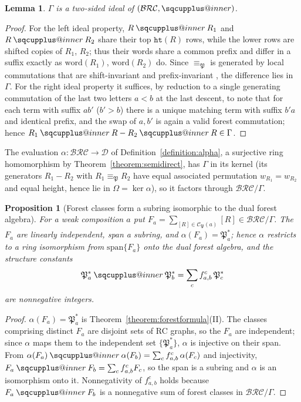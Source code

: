 \documentclass{amsart}
\makeatletter
\newtheorem{proposition}[theorem]{Proposition}
\newtheorem{lemma}[theorem]{Lemma}
\theoremstyle{definition}
\theoremstyle{remark}
\newcommand{\BRC}{\mathcal{BRC}}
\newcommand{\dcoma}{\mathcal{D}}
\newcommand{\forest}{\mathfrak{P}}
\newcommand{\wof}[1]{w_{#1}}
\newcommand{\hr}{\mathtt{ht}}
\newcommand{\sqcupplus@inner}[2]{%
  \vcenter{\hbox{\ooalign{%
    \hfil$\m@th#1\sqcup$\hfil\cr
    \hfil\raisebox{0.15ex}{$\m@th#1\scriptscriptstyle+$}\hfil\cr
  }}}%
}
\newcommand{\sqcupplus}{\mathbin{\mathpalette\sqcupplus@inner\relax}}
\makeatother
\begin{document}
\begin{lemma}\label{lemma:forestideal}
$\Gamma$ is a two-sided ideal of $(\BRC,\sqcupplus)$.
\end{lemma}
\begin{proof}
For the left ideal property, $R\sqcupplus R_1$ and $R\sqcupplus R_2$ share their top $\hr(R)$ rows, while the lower rows are shifted copies of $R_1$, $R_2$; thus their words share a common prefix and differ in a suffix exactly as $\mathrm{word}(R_1)$, $\mathrm{word}(R_2)$ do. Since $\equiv_{\forest}$ is generated by local commutations that are shift-invariant \cite[Proposition~5.8]{nadeau2024forest} and prefix-invariant \cite[Lemma~5.9]{nadeau2024forest}, the difference lies in $\Gamma$. For the right ideal property it suffices, by reduction to a single generating commutation of the last two letters $a<b$ at the last descent, to note that for each term with suffix $ab'$ ($b'>b$) there is a unique matching term with suffix $b'a$ and identical prefix, and the swap of $a,b'$ is again a valid forest commutation; hence $R_1\sqcupplus R-R_2\sqcupplus R\in\Gamma$.
\end{proof}

The evaluation $\alpha:\BRC\to\dcoma$ of Definition~\ref{definition:alpha}, a surjective ring homomorphism by Theorem~\ref{theorem:semidirect}, has $\Gamma$ in its kernel (its generators $R_1-R_2$ with $R_1\equiv_{\forest}R_2$ have equal associated permutation $\wof{R_1}=\wof{R_2}$ and equal height, hence lie in $\Omega=\ker\alpha$), so it factors through $\BRC/\Gamma$.

\begin{proposition}[Forest classes form a subring isomorphic to the dual forest algebra]\label{prop:forest_basis}
For a weak composition $a$ put $F_a=\sum_{[R]\in\mathcal{C}_{\forest}(a)}[R]\in\BRC/\Gamma$. The $F_a$ are linearly independent, span a subring, and $\alpha(F_a)=\forest_a^*$; hence $\alpha$ restricts to a ring isomorphism from $\mathrm{span}\{F_a\}$ onto the dual forest algebra, and the structure constants
\[
\forest_a^*\sqcupplus\forest_b^*=\sum_c f_{a,b}^c\,\forest_c^*
\]
are nonnegative integers.
\end{proposition}
\begin{proof}
$\alpha(F_a)=\forest_a^*$ is Theorem~\ref{theorem:forestformula}(II). The classes comprising distinct $F_a$ are disjoint sets of RC graphs, so the $F_a$ are independent; since $\alpha$ maps them to the independent set $\{\forest_a^*\}$, $\alpha$ is injective on their span. From $\alpha(F_a)\sqcupplus\alpha(F_b)=\sum_c f_{a,b}^c\,\alpha(F_c)$ and injectivity, $F_a\sqcupplus F_b=\sum_c f_{a,b}^c F_c$, so the span is a subring and $\alpha$ is an isomorphism onto it. Nonnegativity of $f_{a,b}^c$ holds because $F_a\sqcupplus F_b$ is a nonnegative sum of forest classes in $\BRC/\Gamma$.
\end{proof}
\end{document}
